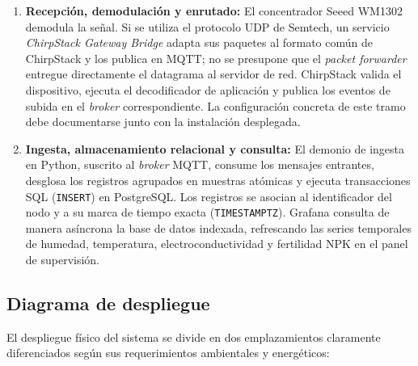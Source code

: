 \begin{enumerate}
    \item \textbf{Recepción, demodulación y enrutado:} El concentrador Seeed WM1302 demodula la señal. Si se utiliza el protocolo UDP de Semtech, un servicio \textit{ChirpStack Gateway Bridge} adapta sus paquetes al formato común de ChirpStack y los publica en MQTT; no se presupone que el \textit{packet forwarder} entregue directamente el datagrama al servidor de red. ChirpStack valida el dispositivo, ejecuta el decodificador de aplicación y publica los eventos de subida en el \textit{broker} correspondiente. La configuración concreta de este tramo debe documentarse junto con la instalación desplegada.

    \item \textbf{Ingesta, almacenamiento relacional y consulta:} El demonio de ingesta en Python, suscrito al \textit{broker} MQTT, consume los mensajes entrantes, desglosa los registros agrupados en muestras atómicas y ejecuta transacciones SQL (\texttt{INSERT}) en PostgreSQL. Los registros se asocian al identificador del nodo y a su marca de tiempo exacta (\texttt{TIMESTAMPTZ}). Grafana consulta de manera asíncrona la base de datos indexada, refrescando las series temporales de humedad, temperatura, electroconductividad y fertilidad NPK en el panel de supervisión.
\end{enumerate}

\subsection{Diagrama de despliegue}

El despliegue físico del sistema se divide en dos emplazamientos claramente diferenciados según sus requerimientos ambientales y energéticos:

